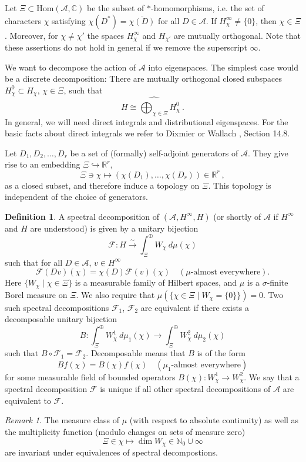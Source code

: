 \documentclass[10]{amsart}
\theoremstyle{remark}
\newtheorem{rem}[thm]{Remark}
\theoremstyle{definition}
\newtheorem{Def}[thm]{Definition}
\numberwithin{equation}{section}
\newcommand{\R}{\mathbb{R}}           %
\newcommand{\C}{\mathbb{C}}           %
\newcommand{\N}{\mathbb{N}}           %
\newcommand{\Hom}{\mathrm{Hom}}
\newcommand{\Cal}{\mathcal}
\newcommand{\be}{\begin{equation}}
\begin{document}
{Let $\Xi\subset \Hom(\Cal A, \C)$ be the subset of $*$-homomorphisms,  i.e. the set of characters $\chi$  satisfying $\chi(D^*)=\overline{\chi(D)}$ for all $D\in\Cal{A}$.
If $H_\chi^{\infty}\ne \{0\}$, then $\chi\in\Xi$. Moreover, for $\chi\ne\chi'$ the spaces $H_\chi^{\infty}$ and $H_{\chi'}$ are mutually orthogonal.
Note that these assertions do not hold in general if we remove the superscript $\infty$.

We want to decompose the action of $\Cal A$  into eigenspaces. The simplest case would be a discrete decomposition: There are mutually orthogonal closed subspaces
$H_\chi^0\subset H_\chi$, $\chi\in\Xi$, such that
\begin{equation}\label{disc}
H\cong \widehat{\bigoplus_{\chi\in\Xi}} {H}_\chi^0\ .
\end{equation}
In general, we will need direct integrals and distributional eigenspaces. For the basic facts about direct integrals we refer to Dixmier \cite{Di} or Wallach \cite{Wa92}, Section 14.8.

Let $D_1,D_2,\dots, D_r$ be a set of (formally) self-adjoint generators of $\Cal A$. They give rise to an embedding $\Xi\hookrightarrow \R^r$,
$$ \Xi\ni\chi\mapsto (\chi(D_1),\dots,\chi(D_r))\in\R^r\ ,$$
as a closed subset,
and therefore induce a topology on $\Xi$. This topology is independent of the choice of generators.

\begin{Def}\label{kobold1} A spectral decomposition of $(\Cal A, H^\infty, H)$ (or shortly of $\Cal A$ if $H^\infty$ and $H$ are understood) is given by a unitary
bijection
$$\Cal F: H\stackrel{\sim}{\longrightarrow} \int_\Xi^\oplus W_\chi\:d\mu(\chi)$$
such that for all $D\in\Cal A$, $v\in H^\infty$
\be\label{IQ} \Cal F(Dv)(\chi)=\chi(D) \Cal F(v)(\chi)  \quad(\mu\mbox{-almost everywhere}).
\end{equation}
Here $\{W_\chi\mid\chi\in\Xi\}$ is a measurable family of Hilbert spaces, and $\mu$ is a $\sigma$-finite Borel measure on $\Xi$.
We also require that $\mu(\{\chi\in\Xi\mid W_\chi=\{0\}\})=0$.
Two such spectral decompositions $\Cal F_1$, $\Cal F_2$ are equivalent if there exists a decomposable unitary bijection
$$ B:  \int_\Xi^\oplus W^1_\chi\:d\mu_1(\chi)\longrightarrow  \int_\Xi^\oplus W^2_\chi\:d\mu_2(\chi) $$
such that $B\circ \Cal F_1=\Cal F_2$. Decomposable means that $B$ is of the form
$$  Bf(\chi)=B(\chi)f(\chi) \quad(\mu_1\mbox{-almost everywhere}) $$
for some measurable field of bounded operators $B(\chi): W_\chi^1\rightarrow W_\chi^2$.
We say that a spectral decomposition $\Cal F$ is unique if all other spectral decompositions of $\Cal A$ are equivalent to $\Cal F$.
\end{Def}
\begin{rem} The measure class of $\mu$ (with respect to absolute continuity) as well as the multiplicity function (modulo changes on sets of measure zero)
$$ \Xi \in \chi\mapsto \dim W_\chi\in \N_0\cup \infty $$
are invariant under equivalences of spectral decompostions.
\end{rem}

}
\end{document}
